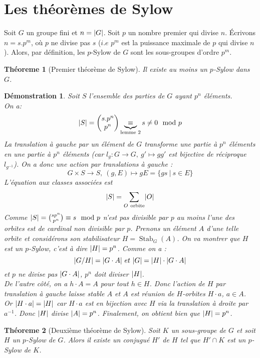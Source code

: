 \documentclass[a4paper, oneside]{report}
\theoremstyle{break}
\newtheorem{thm}{Théoreme}[section] %
\newtheorem*{demonstration}{Démonstration}
\newcommand{\sgs}{sous-groupes }
\newcommand{\x}{\times}
\DeclarePairedDelimiter\abs{\lvert}{\rvert}%
\DeclareMathOperator{\Stab}{Stab}
\newcommand{\ub}{\underbrace}
\begin{document}
\section{Les théorèmes de Sylow}

Soit $G$ un groupe fini et $n = \abs{G}$. Soit $p$ un nombre premier qui divise $n$. Écrivons $n = s.p^m$, où $p$ ne divise pas $s$ ($i.e$ $p^m$ est la puissance maximale de $p$ qui divise $n$). Alors, par définition, les $p$-Sylow de $G$ sont les \sgs d'ordre $p^m$.

\begin{thm}[Premier théorème de Sylow]
Il existe au moins un $p$-Sylow dans $G$.
\end{thm}

\begin{demonstration}
Soit $S$ l'ensemble des parties de $G$ ayant $p^n$ éléments.\\
On a:
\[
\abs{S} = 
\begin{pmatrix}
s.p^n		\\	p^n
\end{pmatrix} 
\ub{\equiv}_{\text{lemme 2}} s \neq 0 \mod p
\]
La translation à gauche par un élément de $G$ transforme une partie à $p^n$ éléments en une partie à $p^n$ éléments (car $l_g : G\rightarrow G,~g'\mapsto gg'$ est bijective de réciproque $l_{g^{-1}}$). On a donc une action par translations à gauche :
$$G\x S \rightarrow S,~(g,E)\mapsto gE = \{gs~|~s\in E\}$$
L'équation aux classes associées est
\[
\abs{S} = \sum_{O~\text{orbite}} \abs{O}
\]
Comme $\abs{S}=\binom{sp^n}{p^n}\equiv s \mod p$ n'est pas divisible par $p$ au moins l'une des orbites est de cardinal non divisible par $p$. Prenons un élément $A$ d'une telle orbite et considérons son stabilisateur $H = \Stab_G(A)$. On va montrer que $H$ est un $p$-Sylow, c'est à dire $\abs{H} = p^n$. Comme on a :
$$\abs{G/H} = \abs{G\cdot A}~et~\abs{G}=\abs{H}\cdot\abs{G\cdot A}$$
et $p$ ne divise pas $\abs{G\cdot A}$, $p^n$ doit diviser $\abs{H}$.\\
De l'autre côté, on a $h\cdot A = A$ pour tout $h\in H$. Donc l'action de $H$ par translation à gauche laisse stable $A$ et $A$ est réunion de $H$-orbites $H\cdot a$, $a \in A$.\\
Or $\abs{H\cdot a}=\abs{H}$ car $H\cdot a$ est en bijection avec $H$ via la translation à droite par $a^{-1}$.
Donc $\abs{H}$ divise $\abs{A} = p^n$. Finalement, on obtient bien que $\abs{H} = p^n$.
\end{demonstration}

\begin{thm}[Deuxième théorème de Sylow]
Soit $K$ un sous-groupe de $G$ et soit $H$ un $p$-Sylow de $G$. Alors il existe un conjugué $H'$ de $H$ tel que $H' \cap K$ est un $p$-Sylow de $K$.
\end{thm}
\end{document}
